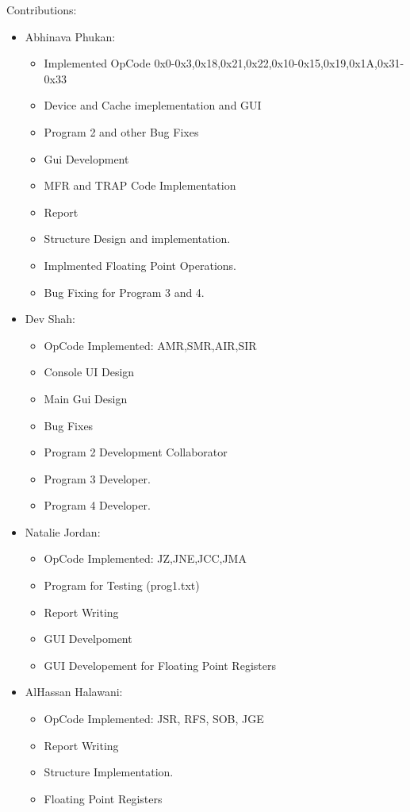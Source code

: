 \documentclass[10pt]{article}
\begin{document}
Contributions:
\begin{itemize}
  \item Abhinava Phukan:
  \begin{itemize}[label=--]
    \item Implemented OpCode 0x0-0x3,0x18,0x21,0x22,0x10-0x15,0x19,0x1A,0x31-0x33
    \item Device and Cache imeplementation and GUI
    \item Program 2 and other Bug Fixes
    \item Gui Development
    \item MFR and TRAP Code Implementation
    \item Report
    \item Structure Design and implementation.
    \item Implmented Floating Point Operations.
    \item Bug Fixing for Program 3 and 4.
  \end{itemize}
  \item Dev Shah:
  \begin{itemize}[label=--]
    \item OpCode Implemented: AMR,SMR,AIR,SIR
    \item Console UI Design
    \item Main Gui Design
    \item Bug Fixes
    \item Program 2 Development Collaborator
    \item Program 3 Developer.
    \item Program 4 Developer.
  \end{itemize}
  \item Natalie Jordan:
  \begin{itemize}[label=--]
    \item OpCode Implemented: JZ,JNE,JCC,JMA
    \item Program for Testing (prog1.txt)
    \item Report Writing
    \item GUI Develpoment
    \item GUI Developement for Floating Point Registers
  \end{itemize}
  \item AlHassan Halawani:
  \begin{itemize}[]
    \item OpCode Implemented: JSR, RFS, SOB, JGE
    \item Report Writing
    \item Structure Implementation.
    \item Floating Point Registers
  \end{itemize}
\end{itemize}
\end{document}
